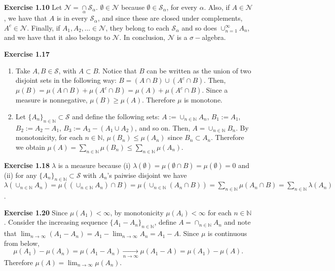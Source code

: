 \documentclass[11.5pt, letterpaper, bibtotoc,
    tablecaptionabove, figurecaptionabove]{article}
\begin{document}
\textbf{Exercise 1.10}
Let $\mathcal N = \underset{\alpha}{\cap}\mathcal S_\alpha$.
$\emptyset\in\mathcal N$ because $\emptyset\in\mathcal S_\alpha$, for every $\alpha$.
Also, if $A\in\mathcal N$, we have that $A$ is in every $\mathcal S_\alpha$,
and since these are closed under complements, $A^c\in\mathcal N$.
Finally, if $A_1, A_2,\ldots\in\mathcal N$, they belong to each $\mathcal S_\alpha$ and so does 
$\cup_{n=1}^\infty A_n$, and we have that it also belongs to $\mathcal N$.
In conclusion, $\mathcal N$ is a $\sigma-$algebra.

\textbf{Exercise 1.17}
\begin{enumerate}
\item
Take $A,B\in\mathcal S$, with $A\subset B$.
Notice that $B$ can be written as the union of two disjoint sets in the following way: 
$B = (A\cap B) \cup (A^c\cap B)$.
Then, $\mu(B)=\mu(A\cap B) + \mu(A^c\cap B) = \mu(A) + \mu(A^c\cap B)$.
Since a measure is nonnegative, $\mu(B)\geq\mu(A)$.
Therefore $\mu$ is monotone.

\item
Let $\{A_n\}_{n\in\mathbb N}\subset\mathcal S$ and define the following sets: $A := \cup_{n\in\mathbb N} A_n$,
$B_1 := A_1$, $B_2 := A_2-A_1$, $B_3 := A_3-(A_1\cup A_2)$, and so on.
Then, $A = \cup_{n\in\mathbb N} B_n$.
By monotonicity, for each $n\in\mathbb N$, $\mu(B_n)\leq\mu(A_n)$ since $B_n\subset A_n$.
Therefore we obtain $\mu(A)=\sum_{n\in\mathbb N}\mu(B_n)\leq \sum_{n\in\mathbb N}\mu(A_n)$.
\end{enumerate}

\textbf{Exercise 1.18}
$\lambda$ is a measure because (i) $\lambda(\emptyset) = \mu(\emptyset\cap B) = \mu(\emptyset) = 0$
and (ii) for any $\{A_n\}_{n\in\mathbb N}\subset\mathcal S$ with $A_n$'s paiwise disjoint we have
$\lambda(\cup_{n\in\mathbb N} A_n) = \mu\left((\cup_{n\in\mathbb N} A_n) \cap B\right) =
\mu\left(\cup_{n\in\mathbb N} (A_n \cap B)\right) = \sum_{n\in\mathbb N}\mu(A_n\cap B) = \sum_{n\in\mathbb N}\lambda(A_n)$.

\textbf{Exercise 1.20}
Since $\mu(A_1)<\infty$, by monotonicity $\mu(A_i)<\infty$ for each $n\in\mathbb N$.
Consider the increasing sequence $\{A_1-A_n\}_{n\in\mathbb N}$,
define $A=\cap_{n\in\mathbb N} A_n$
and note that $\lim_{n\to\infty}(A_1-A_n) = A_1-\lim_{n\to\infty}A_n = A_1-A$.
Since $\mu$ is continuous from below,
\begin{equation*}
\mu(A_1)-\mu(A_n) = \mu(A_1-A_n) \underset{n\to\infty}{\longrightarrow}
\mu(A_1-A) = \mu(A_1)-\mu(A).
\end{equation*}
Therefore $\mu(A)=\lim_{n\to\infty}\mu(A_n)$.
\end{document}
